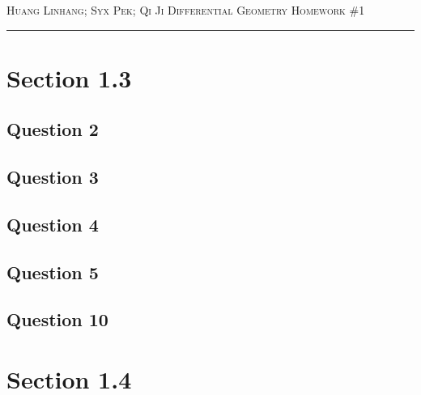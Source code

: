 \documentclass[12pt]{article}
\begin{document}
\thispagestyle{empty}

{\scshape Huang Linhang; Syx Pek; Qi Ji} \hfill {\scshape \large Differential Geometry} \hfill {\scshape Homework \#1}

\smallskip
\hrule
\bigskip

\section{Section 1.3}

\subsection*{Question 2}

\subsection*{Question 3}

\subsection*{Question 4}

\subsection*{Question 5}

\subsection*{Question 10}


\section{Section 1.4}
\end{document}
